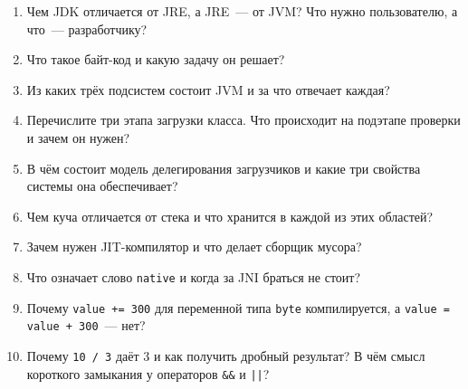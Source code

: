 \begin{enumerate}
\item Чем JDK отличается от JRE, а JRE~--- от JVM? Что нужно пользователю, а
      что~--- разработчику?
\item Что такое байт-код и какую задачу он решает?
\item Из каких трёх подсистем состоит JVM и за что отвечает каждая?
\item Перечислите три этапа загрузки класса. Что происходит на подэтапе
      проверки и зачем он нужен?
\item В чём состоит модель делегирования загрузчиков и какие три свойства
      системы она обеспечивает?
\item Чем куча отличается от стека и что хранится в каждой из этих областей?
\item Зачем нужен JIT-компилятор и что делает сборщик мусора?
\item Что означает слово \texttt{native} и когда за JNI браться не стоит?
\item Почему \texttt{value += 300} для переменной типа \texttt{byte}
      компилируется, а \texttt{value = value + 300}~--- нет?
\item Почему \texttt{10 / 3} даёт 3 и как получить дробный результат? В чём
      смысл короткого замыкания у операторов \texttt{\&\&} и \texttt{||}?
\end{enumerate}

\testzadaniya

